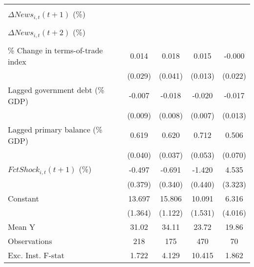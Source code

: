 {\begin{tabular}{l*{4}{c}}
                    &                     &                     &                     &                     \\
\addlinespace
$ \Delta News_{i,t}(t+1)$ (\%)&                     &                     &                     &                     \\
                    &                     &                     &                     &                     \\
\addlinespace
$ \Delta News_{i,t}(t+2)$ (\%)&                     &                     &                     &                     \\
                    &                     &                     &                     &                     \\
\addlinespace
\% Change in terms-of-trade index&       0.014         &       0.018         &       0.015         &      -0.000         \\
                    &     (0.029)         &     (0.041)         &     (0.013)         &     (0.022)         \\
\addlinespace
Lagged government debt (\% GDP)&      -0.007         &      -0.018\sym{*}  &      -0.020\sym{**} &      -0.017         \\
                    &     (0.009)         &     (0.008)         &     (0.007)         &     (0.013)         \\
\addlinespace
Lagged primary balance (\% GDP)&       0.619\sym{***}&       0.620\sym{***}&       0.712\sym{***}&       0.506\sym{***}\\
                    &     (0.040)         &     (0.037)         &     (0.053)         &     (0.070)         \\
\addlinespace
$ FctShock_{i,t}(t+1)$ (\%)&      -0.497         &      -0.691\sym{*}  &      -1.420\sym{***}&       4.535         \\
                    &     (0.379)         &     (0.340)         &     (0.440)         &     (3.323)         \\
\addlinespace
Constant            &      13.697\sym{***}&      15.806\sym{***}&      10.091\sym{***}&       6.316         \\
                    &     (1.364)         &     (1.122)         &     (1.531)         &     (4.016)         \\
\midrule
Mean Y              &       31.02         &       34.11         &       23.72         &       19.86         \\
Observations        &         218         &         175         &         470         &          70         \\
Exc. Inst. F-stat   &       1.722         &       4.129         &      10.415         &       1.862         \\
\bottomrule
\end{tabular}
}
